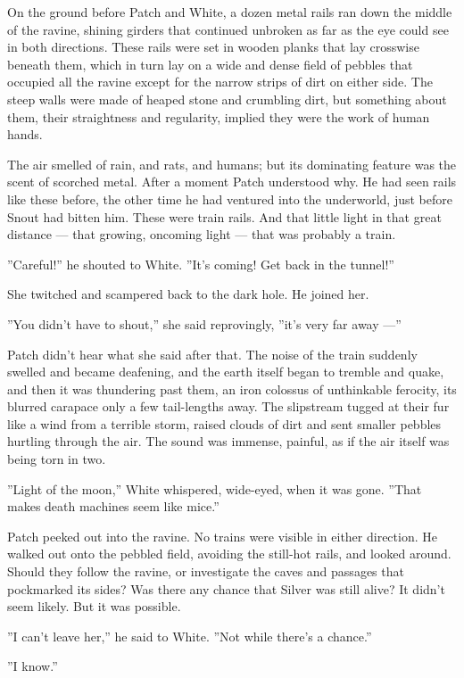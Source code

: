 \documentclass[12pt]{book}
\begin{document}
On the ground before Patch and White, a dozen metal rails ran down the
middle of the ravine, shining girders that continued unbroken as far
as the eye could see in both directions. These rails were set in
wooden planks that lay crosswise beneath them, which in turn lay on a
wide and dense field of pebbles that occupied all the ravine except
for the narrow strips of dirt on either side. The steep walls were
made of heaped stone and crumbling dirt, but something about them,
their straightness and regularity, implied they were the work of human
hands.

The air smelled of rain, and rats, and humans; but its dominating
feature was the scent of scorched metal. After a moment Patch
understood why. He had seen rails like these before, the other time he
had ventured into the underworld, just before Snout had bitten
him. These were train rails. And that little light in that great
distance --- that growing, oncoming light --- that was probably a
train.

''Careful!'' he shouted to White. ''It's coming! Get back in the
tunnel!''

She twitched and scampered back to the dark hole. He joined her.

''You didn't have to shout,'' she said reprovingly, ''it's very far
away ---''

Patch didn't hear what she said after that. The noise of the train
suddenly swelled and became deafening, and the earth itself began to
tremble and quake, and then it was thundering past them, an iron
colossus of unthinkable ferocity, its blurred carapace only a few
tail-lengths away. The slipstream tugged at their fur like a wind from
a terrible storm, raised clouds of dirt and sent smaller pebbles
hurtling through the air. The sound was immense, painful, as if the
air itself was being torn in two.

''Light of the moon,'' White whispered, wide-eyed, when it was
gone. ''That makes death machines seem like mice.''

Patch peeked out into the ravine. No trains were visible in either
direction. He walked out onto the pebbled field, avoiding the
still-hot rails, and looked around. Should they follow the ravine, or
investigate the caves and passages that pockmarked its sides? Was
there any chance that Silver was still alive? It didn't seem
likely. But it was possible.

''I can't leave her,'' he said to White. ''Not while there's a
chance.''

''I know.''
\end{document}
